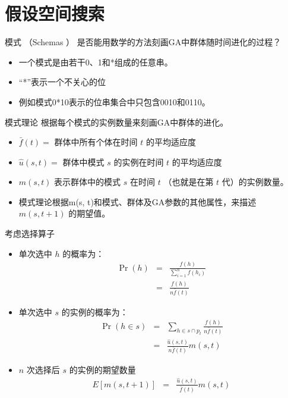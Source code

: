 \documentclass[presentation]{beamer}
\begin{document}
\section{假设空间搜索}
\label{sec:orgfe54e94}
\begin{frame}[label={sec:orgf70732c}]{模式 （Schemas ）}
是否能用数学的方法刻画GA中群体随时间进化的过程？

\begin{itemize}
\item 一个模式是由若干0、1和*组成的任意串。
\item “*”表示一个不关心的位
\item 例如模式0*10表示的位串集合中只包含0010和0110。
\end{itemize}
\end{frame}
\begin{frame}[label={sec:org7432631}]{模式理论}
根据每个模式的实例数量来刻画GA中群体的进化。
\begin{itemize}
\item \(\bar{f}(t) =\)  群体中所有个体在时间 \(t\) 的平均适应度
\item \(\hat{u}(s,t) =\)  群体中模式 \(s\) 的实例在时间 \(t\) 的平均适应度
\item \(m(s, t)\) 表示群体中的模式 \(s\) 在时间 \(t\) （也就是在第 \(t\) 代）的实例数量。
\item 模式理论根据m(s, t)和模式、群体及GA参数的其他属性，来描述 \(m(s, t+1)\) 的期望值。
\end{itemize}
\end{frame}
\begin{frame}[label={sec:orgdcbc999}]{考虑选择算子}
\begin{itemize}
\item 单次选中 \(h\) 的概率为：
\begin{eqnarray}
\Pr(h) & = & \frac{f(h)}{\sum_{i=1}^{n} f(h_i)} \nonumber \\
& = & \frac{f(h)}{n \bar{f}(t)} \nonumber
\end{eqnarray}
\item 单次选中 \(s\) 的实例的概率为：
\begin{eqnarray}
\Pr(h \in s) & = & \sum_{h\in s \cap p_{t}} \frac{f(h)}{n \bar{f}(t)} \nonumber \\
 & = & \frac{\hat{u}(s,t)}{n \bar{f}(t)}m(s,t)  \nonumber
\end{eqnarray}
\item \(n\) 次选择后 \(s\) 的实例的期望数量
\begin{eqnarray}
E[m(s,t+1)] & = & \frac{\hat{u}(s,t)}{\bar{f}(t)}m(s,t)  \nonumber
\end{eqnarray}
\end{itemize}
\end{frame}
\end{document}
